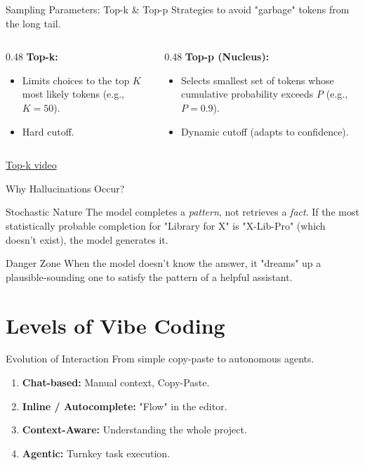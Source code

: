 \documentclass[aspectratio=169]{beamer}
\begin{document}
\begin{frame}[t]{Sampling Parameters: Top-k \& Top-p}
    Strategies to avoid "garbage" tokens from the long tail.
    \begin{columns}[T]
        \begin{column}{0.48\textwidth}
            \textbf{Top-k:}
            \begin{itemize}
                \item Limits choices to the top $K$ most likely tokens (e.g., $K=50$).
                \item Hard cutoff.
            \end{itemize}
        \end{column}
        \begin{column}{0.48\textwidth}
            \textbf{Top-p (Nucleus):}
            \begin{itemize}
                \item Selects smallest set of tokens whose cumulative probability exceeds $P$ (e.g., $P=0.9$).
                \item Dynamic cutoff (adapts to confidence).
            \end{itemize}
        \end{column}
    \end{columns}
    \href{https://youtu.be/aDmp2Uim0zQ?si=teTTcRsDLtA3BuUH}{Top-k video}
\end{frame}

\begin{frame}[t]{Why Hallucinations Occur?}
    \begin{block}{Stochastic Nature}
        The model completes a \textit{pattern}, not retrieves a \textit{fact}.
        If the most statistically probable completion for "Library for X" is "X-Lib-Pro" (which doesn't exist), the model generates it.
    \end{block}
    \begin{alertblock}{Danger Zone}
        When the model doesn't know the answer, it "dreams" up a plausible-sounding one to satisfy the pattern of a helpful assistant.
    \end{alertblock}
\end{frame}

\section{Levels of Vibe Coding}

\begin{frame}[t]{Evolution of Interaction}
    From simple copy-paste to autonomous agents.
    \begin{enumerate}
        \item \textbf{Chat-based:} Manual context, Copy-Paste.
        \item \textbf{Inline / Autocomplete:} "Flow" in the editor.
        \item \textbf{Context-Aware:} Understanding the whole project.
        \item \textbf{Agentic:} Turnkey task execution.
    \end{enumerate}
\end{frame}
\end{document}

